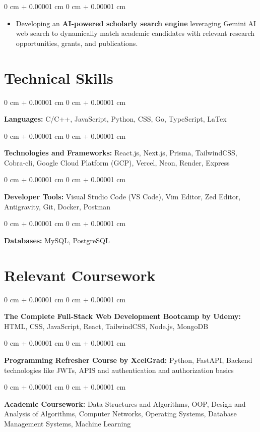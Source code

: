\documentclass[10pt, letterpaper]{article}
\newenvironment{highlights}{
    \begin{itemize}[
        topsep=0.10 cm,
        parsep=0.10 cm,
        partopsep=0pt,
        itemsep=0pt,
        leftmargin=0 cm + 10pt
    ]
}{
    \end{itemize}
}
\newenvironment{onecolentry}{
    \begin{adjustwidth}{
        0 cm + 0.00001 cm
    }{
        0 cm + 0.00001 cm
    }
}{
    \end{adjustwidth}
}
\begin{document}
        \vspace{0.15 cm}
        \begin{onecolentry}
            \begin{highlights}
                \item Developing an \textbf{AI-powered scholarly search engine} leveraging Gemini AI web search to dynamically match academic candidates with relevant research opportunities, grants, and publications.
            \end{highlights}
        \end{onecolentry}
        
    \section{Technical Skills}

        \begin{onecolentry}
            \textbf{Languages:} C/C++, JavaScript, Python, CSS, Go, TypeScript, LaTex
        \end{onecolentry}
        \vspace{0.1 cm}
        \begin{onecolentry}
            \textbf{Technologies and Frameworks:} React.js, Next.js, Prisma, TailwindCSS, Cobra-cli, Google Cloud Platform (GCP), Vercel, Neon, Render, Express
        \end{onecolentry}
        \vspace{0.1 cm}
        \begin{onecolentry}
            \textbf{Developer Tools:} Visual Studio Code (VS Code), Vim Editor, Zed Editor, Antigravity, Git, Docker, Postman
        \end{onecolentry}
        \vspace{0.1 cm}
        \begin{onecolentry}
            \textbf{Databases:} MySQL, PostgreSQL
        \end{onecolentry}

    \section{Relevant Coursework}

        \begin{onecolentry}
            \textbf{The Complete Full-Stack Web Development Bootcamp by Udemy:} HTML, CSS, JavaScript, React, TailwindCSS, Node.js, MongoDB
        \end{onecolentry}
        \vspace{0.1 cm}
        \begin{onecolentry}
            \textbf{Programming Refresher Course by XcelGrad:} Python, FastAPI, Backend technologies like JWTs, APIS and authentication and authorization basics
        \end{onecolentry}
        \vspace{0.1 cm}
        \begin{onecolentry}
            \textbf{Academic Coursework:} Data Structures and Algorithms, OOP, Design and Analysis of Algorithms, Computer Networks, Operating Systems, Database Management Systems, Machine Learning
        \end{onecolentry}
\end{document}
